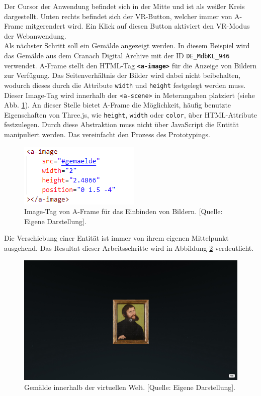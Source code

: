 \documentclass[a4paper,12pt,oneside]{article}
\begin{document}
        Der Cursor der Anwendung befindet sich in der Mitte und ist als weißer
        Kreis dargestellt. Unten rechts befindet sich der VR-Button, welcher
        immer von A-Frame mitgerendert wird. Ein Klick auf diesen Button 
        aktiviert den VR-Modus der Webanwendung. \\
        Als nächster Schritt soll ein Gemälde angezeigt werden. In diesem
        Beispiel wird das Gemälde aus dem Cranach Digital Archive
        mit der ID \texttt{DE\_MdbKL\_946} verwendet. A-Frame stellt
        den HTML-Tag \texttt{\textbf{<a-image>}} für die Anzeige von Bildern
        zur Verfügung.
        Das Seitenverhältnis der Bilder wird dabei nicht beibehalten, wodurch
        dieses durch die Attribute \texttt{width} und \texttt{height} 
        festgelegt werden muss. Dieser Image-Tag wird innerhalb der
        \texttt{<a-scene>} in Meterangaben platziert (siehe Abb. \ref{fig:a-image1}).
        An dieser Stelle bietet A-Frame die Möglichkeit, häufig benutzte
        Eigenschaften von Three.js, wie \texttt{height}, \texttt{width}
        oder \texttt{color}, über HTML-Attribute festzulegen. Durch diese
        Abstraktion muss nicht über JavaScript die Entität manipuliert
        werden. Das vereinfacht den Prozess des Prototypings.
        \begin{figure}
          \centering
          \includegraphics{img/coding/a-image1.png}
          \caption[Image-Tag von A-Frame für das Einbinden von Bildern.]{Image-Tag von A-Frame für das Einbinden von Bildern. [Quelle: Eigene Darstellung].}
          \label{fig:a-image1}
        \end{figure}
        Die Verschiebung einer Entität ist immer 
        von ihrem eigenen Mittelpunkt ausgehend. 
        Das Resultat dieser Arbeitsschritte wird in Abbildung \ref{fig:vr-welt2}
        verdeutlicht.
        \begin{figure}[h]
          \centering
          \includegraphics[scale=0.3]{img/coding/vr-welt2.png}
          \caption[Gemälde innerhalb der virtuellen Welt.]{Gemälde innerhalb der virtuellen Welt. [Quelle: Eigene Darstellung].}
          \label{fig:vr-welt2}
        \end{figure} \\
\end{document}
